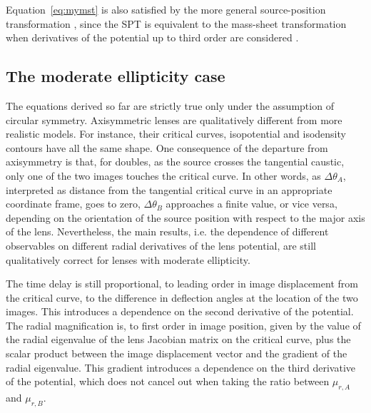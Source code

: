 \documentclass[usenatbib]{mnras}
\def\Eref#1{Equation~\ref{#1}\xspace}
\begin{document}
\Eref{eq:mymst} is also satisfied by the more general source-position transformation \citep[SPT][]{S+S14}, since the SPT is equivalent to the mass-sheet transformation when derivatives of the potential up to third order are considered \citep[see subsection 3.2 of][]{S+S14}.

\subsection{The moderate ellipticity case}

The equations derived so far are strictly true only under the assumption of circular symmetry.
Axisymmetric lenses are qualitatively different from more realistic models.
For instance, their critical curves, isopotential and isodensity contours have all the same shape.
One consequence of the departure from axisymmetry is that, for doubles, as the source crosses the tangential caustic, only one of the two images touches the critical curve.
In other words, as $\Delta\theta_A$, interpreted as distance from the tangential critical curve in an appropriate coordinate frame, goes to zero, $\Delta\theta_B$ approaches a finite value, or vice versa, depending on the orientation of the source position with respect to the major axis of the lens.
Nevertheless, the main results, i.e. the dependence of different observables on different radial derivatives of the lens potential, are still qualitatively correct for lenses with moderate ellipticity.

The time delay is still proportional, to leading order in image displacement from the critical curve, to the difference in deflection angles at the location of the two images.
This introduces a dependence on the second derivative of the potential.
The radial magnification is, to first order in image position, given by the value of the radial eigenvalue of the lens Jacobian matrix on the critical curve, plus the scalar product between the image displacement vector and the gradient of the radial eigenvalue.
This gradient introduces a dependence on the third derivative of the potential, which does not cancel out when taking the ratio between $\mu_{r,A}$ and $\mu_{r,B}$.
\end{document}
